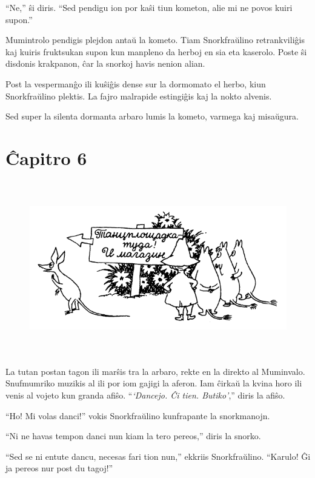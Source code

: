 ``Ne,'' ŝi diris. ``Sed pendigu ion por kaŝi tiun kometon, alie mi ne povos kuiri supon.''

Mumintrolo pendigis plejdon antaŭ la kometo. Tiam Snorkfraŭlino retrankviliĝis kaj kuiris fruktsukan supon kun manpleno da herboj en sia eta kaserolo. Poste ŝi disdonis krakpanon, ĉar la snorkoj havis nenion alian.

Post la vespermanĝo ili kuŝiĝis dense sur la dormomato el herbo, kiun Snorkfraŭlino plektis. La fajro malrapide estingiĝis kaj la nokto alvenis.

Sed super la silenta dormanta arbaro lumis la kometo, varmega kaj misaŭgura.

\chapter*[Ĉapitro 6]{Ĉapitro 6}


\begin{figure}[htbp]
\centering
\includegraphics[width=450pt,height=214pt]{6-1.png}
\caption{}
\label{6-1}
\end{figure}

\noindent La tutan postan tagon ili marŝis tra la arbaro, rekte en la direkto al Muminvalo. Snufmumriko muzikis al ili por iom gajigi la aferon. Iam ĉirkaŭ la kvina horo ili venis al vojeto kun granda afiŝo. ``\emph{`Dancejo. Ĉi tien. Butiko'},'' diris la afiŝo.

``Ho! Mi volas danci!'' vokis Snorkfraŭlino kunfrapante la snorkmanojn.

``Ni ne havas tempon danci nun kiam la tero pereos,'' diris la snorko.

``Sed se ni entute dancu, necesas fari tion nun,'' ekkriis Snorkfraŭlino. ``Karulo! Ĝi ja pereos nur post du tagoj!''

